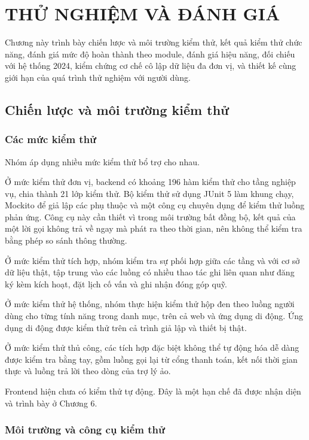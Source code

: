 \documentclass[12pt,a4paper,oneside]{report}
\begin{document}
\chapter{THỬ NGHIỆM VÀ ĐÁNH GIÁ}

Chương này trình bày chiến lược và môi trường kiểm thử, kết quả kiểm thử chức năng, đánh giá mức độ hoàn thành theo module, đánh giá hiệu năng, đối chiếu với hệ thống 2024, kiểm chứng cơ chế cô lập dữ liệu đa đơn vị, và thiết kế cùng giới hạn của quá trình thử nghiệm với người dùng.

\section{Chiến lược và môi trường kiểm thử}

\subsection{Các mức kiểm thử}

Nhóm áp dụng nhiều mức kiểm thử bổ trợ cho nhau.

Ở mức kiểm thử đơn vị, backend có khoảng 196 hàm kiểm thử cho tầng nghiệp vụ, chia thành 21 lớp kiểm thử. Bộ kiểm thử sử dụng JUnit 5 làm khung chạy, Mockito để giả lập các phụ thuộc và một công cụ chuyên dụng để kiểm thử luồng phản ứng. Công cụ này cần thiết vì trong môi trường bất đồng bộ, kết quả của một lời gọi không trả về ngay mà phát ra theo thời gian, nên không thể kiểm tra bằng phép so sánh thông thường.

Ở mức kiểm thử tích hợp, nhóm kiểm tra sự phối hợp giữa các tầng và với cơ sở dữ liệu thật, tập trung vào các luồng có nhiều thao tác ghi liên quan như đăng ký kèm kích hoạt, đặt lịch cố vấn và ghi nhận đóng góp quỹ.

Ở mức kiểm thử hệ thống, nhóm thực hiện kiểm thử hộp đen theo luồng người dùng cho từng tính năng trong danh mục, trên cả web và ứng dụng di động. Ứng dụng di động được kiểm thử trên cả trình giả lập và thiết bị thật.

Ở mức kiểm thử thủ công, các tích hợp đặc biệt không thể tự động hóa dễ dàng được kiểm tra bằng tay, gồm luồng gọi lại từ cổng thanh toán, kết nối thời gian thực và luồng trả lời theo dòng của trợ lý ảo.

Frontend hiện chưa có kiểm thử tự động. Đây là một hạn chế đã được nhận diện và trình bày ở Chương 6.

\subsection{Môi trường và công cụ kiểm thử}
\end{document}
